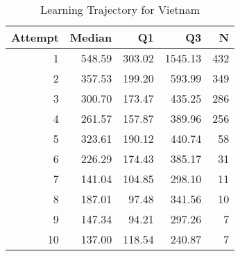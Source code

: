 \begin{table}[htbp]
\centering
\caption{Learning Trajectory for Vietnam}
\label{tab:learning-trajectory}
\begin{tabular}{rrrrr}
\toprule
Attempt & Median & Q1 & Q3 & N \\
\midrule
1 & 548.59 & 303.02 & 1545.13 & 432 \\
2 & 357.53 & 199.20 & 593.99 & 349 \\
3 & 300.70 & 173.47 & 435.25 & 286 \\
4 & 261.57 & 157.87 & 389.96 & 256 \\
5 & 323.61 & 190.12 & 440.74 & 58 \\
6 & 226.29 & 174.43 & 385.17 & 31 \\
7 & 141.04 & 104.85 & 298.10 & 11 \\
8 & 187.01 & 97.48 & 341.56 & 10 \\
9 & 147.34 & 94.21 & 297.26 & 7 \\
10 & 137.00 & 118.54 & 240.87 & 7 \\
\bottomrule
\end{tabular}
\end{table}
